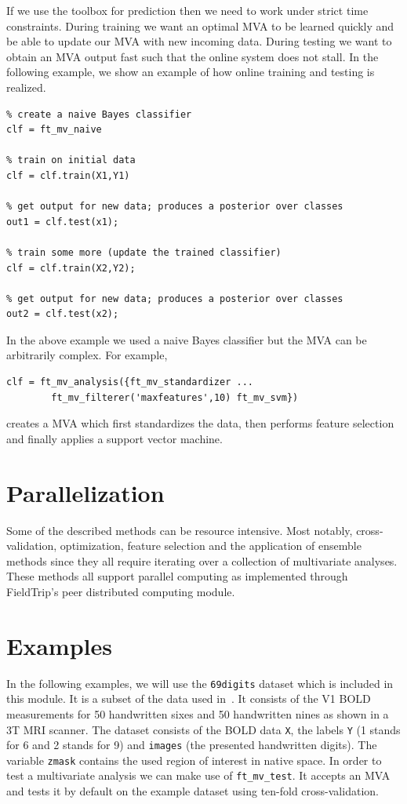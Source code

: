 \documentclass{article}
\renewcommand{\t}[1]{{\tt #1}}
\begin{document}
If we use the toolbox for prediction then we need to work under strict time constraints. During training we want an optimal MVA to be learned quickly and be able to update our MVA with new incoming data. During testing we want to obtain an MVA output fast such that the online system does not stall. In the following example, we show an example of how online training and testing is realized.
\begin{verbatim}
% create a naive Bayes classifier
clf = ft_mv_naive

% train on initial data
clf = clf.train(X1,Y1)

% get output for new data; produces a posterior over classes
out1 = clf.test(x1);

% train some more (update the trained classifier)
clf = clf.train(X2,Y2);

% get output for new data; produces a posterior over classes
out2 = clf.test(x2);
\end{verbatim}
In the above example we used a naive Bayes classifier but the MVA can be arbitrarily complex. For example, 
\begin{verbatim}
clf = ft_mv_analysis({ft_mv_standardizer ...
        ft_mv_filterer('maxfeatures',10) ft_mv_svm})
\end{verbatim}
creates a MVA which first standardizes the data, then performs feature selection and finally applies a support vector machine.

\section{Parallelization}
\label{parallel}

Some of the described methods can be resource intensive. Most notably, cross-validation, optimization, feature selection and the application of ensemble methods since they all require iterating over a collection of multivariate analyses. These methods all support parallel computing as implemented through FieldTrip's peer distributed computing module.


\section{Examples}
\label{examples}

In the following examples, we will use the \t{69digits} dataset which is included in this module. It is a subset of the data used in~\cite{gerven2010,gerven2010a}. It consists of the V1 BOLD measurements for 50 handwritten sixes and 50 handwritten nines as shown in a 3T MRI scanner. The dataset consists of the BOLD data \t{X}, the labels \t{Y} (1 stands for 6 and 2 stands for 9) and \t{images} (the presented handwritten digits). The variable \t{zmask} contains the used region of interest in native space. In order to test a multivariate analysis we can make use of \t{ft\_mv\_test}. It accepts an MVA and tests it by default on the example dataset using ten-fold cross-validation.
\end{document}

